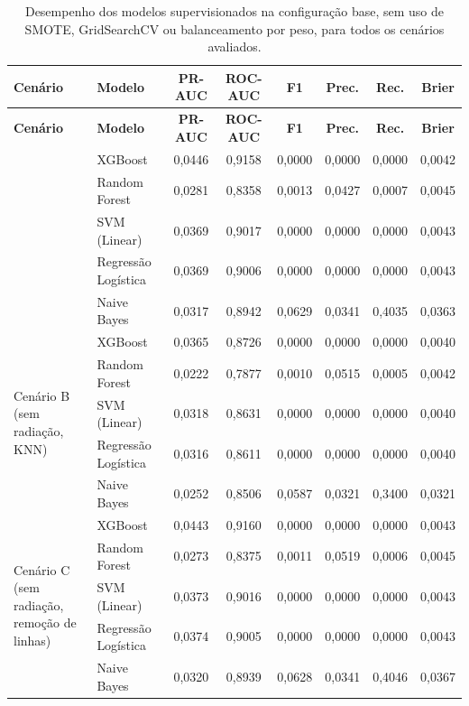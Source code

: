 \begin{longtable}{p{3.2cm} l c c c c c c}
\caption{Desempenho dos modelos supervisionados na configuração base, sem uso de SMOTE, GridSearchCV ou balanceamento por peso, para todos os cenários avaliados.}
\label{tab:resultados_base_sem_tratamento} \\
\toprule
\textbf{Cenário} & \textbf{Modelo} & \textbf{PR-AUC} & \textbf{ROC-AUC} & \textbf{F1} & \textbf{Prec.} & \textbf{Rec.} & \textbf{Brier} \\
\midrule
\endfirsthead

\toprule
\textbf{Cenário} & \textbf{Modelo} & \textbf{PR-AUC} & \textbf{ROC-AUC} & \textbf{F1} & \textbf{Prec.} & \textbf{Rec.} & \textbf{Brier} \\
\midrule
\endhead

\bottomrule
\endfoot

\bottomrule
\endlastfoot

\multirow{5}{*}{\parbox{3.2cm}{\centering Cenário A\\(sem radiação)}} 
   & XGBoost             & 0,0446 & 0,9158 & 0,0000 & 0,0000 & 0,0000 & 0,0042 \\
   & Random Forest       & 0,0281 & 0,8358 & 0,0013 & 0,0427 & 0,0007 & 0,0045 \\
   & SVM (Linear)        & 0,0369 & 0,9017 & 0,0000 & 0,0000 & 0,0000 & 0,0043 \\
   & Regressão Logística & 0,0369 & 0,9006 & 0,0000 & 0,0000 & 0,0000 & 0,0043 \\
   & Naive Bayes         & 0,0317 & 0,8942 & 0,0629 & 0,0341 & 0,4035 & 0,0363 \\
\midrule

\multirow{5}{*}{\parbox{3.2cm}{\centering Cenário B\\(sem radiação, KNN)}} 
   & XGBoost             & 0,0365 & 0,8726 & 0,0000 & 0,0000 & 0,0000 & 0,0040 \\
   & Random Forest       & 0,0222 & 0,7877 & 0,0010 & 0,0515 & 0,0005 & 0,0042 \\
   & SVM (Linear)        & 0,0318 & 0,8631 & 0,0000 & 0,0000 & 0,0000 & 0,0040 \\
   & Regressão Logística & 0,0316 & 0,8611 & 0,0000 & 0,0000 & 0,0000 & 0,0040 \\
   & Naive Bayes         & 0,0252 & 0,8506 & 0,0587 & 0,0321 & 0,3400 & 0,0321 \\
\midrule

\multirow{5}{*}{\parbox{3.2cm}{\centering Cenário C\\(sem radiação, remoção de linhas)}} 
   & XGBoost             & 0,0443 & 0,9160 & 0,0000 & 0,0000 & 0,0000 & 0,0043 \\
   & Random Forest       & 0,0273 & 0,8375 & 0,0011 & 0,0519 & 0,0006 & 0,0045 \\
   & SVM (Linear)        & 0,0373 & 0,9016 & 0,0000 & 0,0000 & 0,0000 & 0,0043 \\
   & Regressão Logística & 0,0374 & 0,9005 & 0,0000 & 0,0000 & 0,0000 & 0,0043 \\
   & Naive Bayes         & 0,0320 & 0,8939 & 0,0628 & 0,0341 & 0,4046 & 0,0367 \\
\midrule


\end{longtable}
